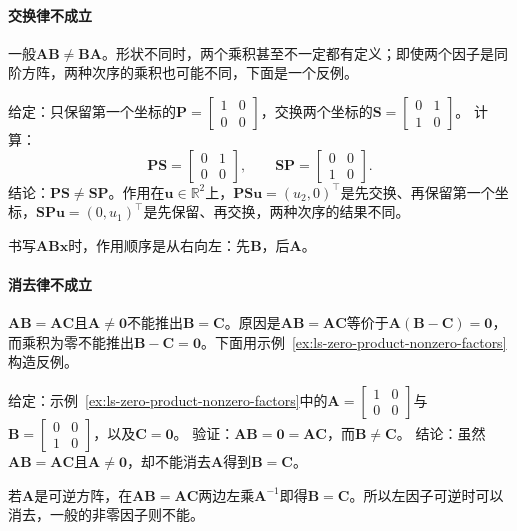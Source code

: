 \paragraph{交换律不成立}
一般$\bm A\bm B\neq\bm B\bm A$。形状不同时，两个乘积甚至不一定都有定义；即使两个因子是同阶方阵，两种次序的乘积也可能不同，下面是一个反例。
\begin{example}[反例：先交换再保留与先保留再交换]
\label{ex:ls-noncommuting-pair}
给定：只保留第一个坐标的$\bm P=\left[\begin{smallmatrix}1&0\\0&0\end{smallmatrix}\right]$，交换两个坐标的$\bm S=\left[\begin{smallmatrix}0&1\\1&0\end{smallmatrix}\right]$。
计算：
\[
 \bm P\bm S=\begin{bmatrix}0&1\\0&0\end{bmatrix},\qquad
 \bm S\bm P=\begin{bmatrix}0&0\\1&0\end{bmatrix}.
\]
结论：$\bm P\bm S\neq\bm S\bm P$。作用在$\bm u\in\mathbb R^2$上，$\bm P\bm S\bm u=(u_2,0)^\top$是先交换、再保留第一个坐标，$\bm S\bm P\bm u=(0,u_1)^\top$是先保留、再交换，两种次序的结果不同。
\end{example}
书写$\bm A\bm B\bm x$时，作用顺序是从右向左：先$\bm B$，后$\bm A$。

\paragraph{消去律不成立}
$\bm A\bm B=\bm A\bm C$且$\bm A\neq\bm0$不能推出$\bm B=\bm C$。原因是$\bm A\bm B=\bm A\bm C$等价于$\bm A(\bm B-\bm C)=\bm0$，而乘积为零不能推出$\bm B-\bm C=\bm0$。下面用示例~\ref{ex:ls-zero-product-nonzero-factors}构造反例。
\begin{example}[反例：非零的左因子不能消去]
\label{ex:ls-cancellation-fails}
给定：示例~\ref{ex:ls-zero-product-nonzero-factors}中的$\bm A=\left[\begin{smallmatrix}1&0\\0&0\end{smallmatrix}\right]$与$\bm B=\left[\begin{smallmatrix}0&0\\1&0\end{smallmatrix}\right]$，以及$\bm C=\bm0$。
验证：$\bm A\bm B=\bm0=\bm A\bm C$，而$\bm B\neq\bm C$。
结论：虽然$\bm A\bm B=\bm A\bm C$且$\bm A\neq\bm0$，却不能消去$\bm A$得到$\bm B=\bm C$。
\end{example}
若$\bm A$是可逆方阵，在$\bm A\bm B=\bm A\bm C$两边左乘$\bm A^{-1}$即得$\bm B=\bm C$。所以左因子可逆时可以消去，一般的非零因子则不能。

